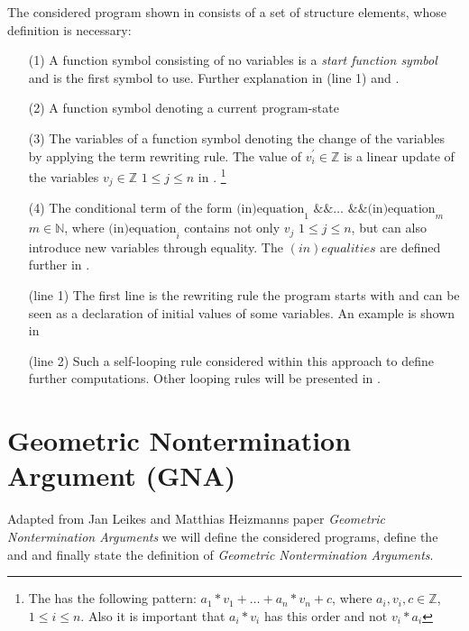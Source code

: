 The considered program shown in  consists of a set of structure elements, whose definition is necessary:
\begin{enumerate}[leftmargin=1]
	\item[(1)] A function symbol consisting of no variables is a \textit{start function symbol} and is the first symbol to use. Further explanation in (line 1) and .
	\item[(2)] A function symbol denoting a current program-state
	\item[(3)] The variables of a function symbol denoting the change of the variables by applying the term rewriting rule. The value of $v^\prime_i \in \mathbb{Z}$ is a linear update of the variables $v_j \in \mathbb{Z}$ $1 \le j \le n$ in \stdLinInt. \footnote{The \stdLinInt has the following pattern: $ a_1*v_1 + \dots + a_n*v_n + c$, where $a_i , v_i, c \in \mathbb{Z}$, $1 \le i\le n$. 
		Also it is important that $a_i * v_i$ has this order and not $v_i*a_i$} 
	\item[(4)] The conditional term of the form $\text{(in)equation}_1 \text{ \&\& } \dots \text{ \&\& } \text{(in)equation}_m$ $m \in \mathbb{N}$, where $\text{(in)equation}_i$ contains not only $v_j$ $1 \le j \le n$, but can also introduce new variables through equality. The $(in)equalities$ are defined further in .
	\item[(line 1)] The first line is the rewriting rule the program starts with and can be seen as a declaration of initial values of some variables. An example is shown in 
	\item[(line 2)] Such a self-looping rule considered within this approach to define further computations. Other looping rules will be presented in .
\end{enumerate} 


\section{Geometric Nontermination Argument (GNA)}
Adapted from Jan Leikes and Matthias Heizmanns paper \textit{Geometric Nontermination Arguments} \cite{leike2014geometric} we will define the considered programs, define the \stem and \loopt and finally state the definition of \textit{Geometric Nontermination Arguments}.

